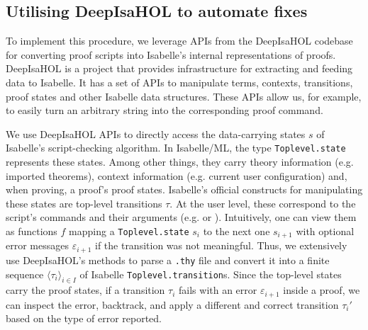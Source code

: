 \documentclass[10pt,conference]{IEEEtran}
\newcommand{\isakw}[1]{{\bfseries\ttfamily\def\isachardot{.}\def\isacharunderscore{\isacharunderscorekeyword}%
\def\isacharbraceleft{\{}\def\isacharbraceright{\}}#1}}
\renewcommand{\isacommand}[1]{\textcolor{IsaBlue}{\isakw{#1}}}
\begin{document}
\subsection{Utilising DeepIsaHOL to automate fixes}
To implement this procedure, we leverage 
APIs from the DeepIsaHOL codebase~\cite{DeepIsaHOL_2023}
for converting proof scripts into Isabelle's internal representations of proofs.
DeepIsaHOL is a project that provides infrastructure for %
extracting and feeding data to Isabelle. It has a set of APIs to manipulate terms, contexts, transitions, proof states and other Isabelle data structures. These APIs allow us, for example, to easily turn an arbitrary string into the corresponding proof command. 

We use DeepIsaHOL APIs to directly access the data-carrying states $s$ of Isabelle's script-checking algorithm. In Isabelle/ML, the type \texttt{Toplevel.state} represents these states. Among other things, they carry theory information (e.g. imported theorems), context information (e.g. current user configuration) and, when proving, a proof's proof states. Isabelle's official constructs for manipulating these states are top-level transitions $\tau$. At the user level, these correspond to the script's commands and their arguments (e.g. \isa{\isacommand{apply} auto} or \isa{\isacommand{have} "$F\, x = y$"}). Intuitively, one can view them as functions $f$ mapping a \texttt{Toplevel.state} $s_i$ to the next one $s_{i+1}$ with optional error messages $\varepsilon_{i+1}$ if the transition was not meaningful. Thus, we extensively use DeepIsaHOL's methods to parse a \texttt{.thy} file and convert it into a finite sequence $\langle \tau_i\rangle_{i\in I}$ of Isabelle \texttt{Toplevel.transition}s. 
Since the top-level states carry the proof states, if a transition $\tau_i$ fails with an error $\varepsilon_{i+1}$ inside a proof, we can inspect the error, backtrack, and apply a different and correct transition $\tau_i'$ based on the type of error reported.
\end{document}
